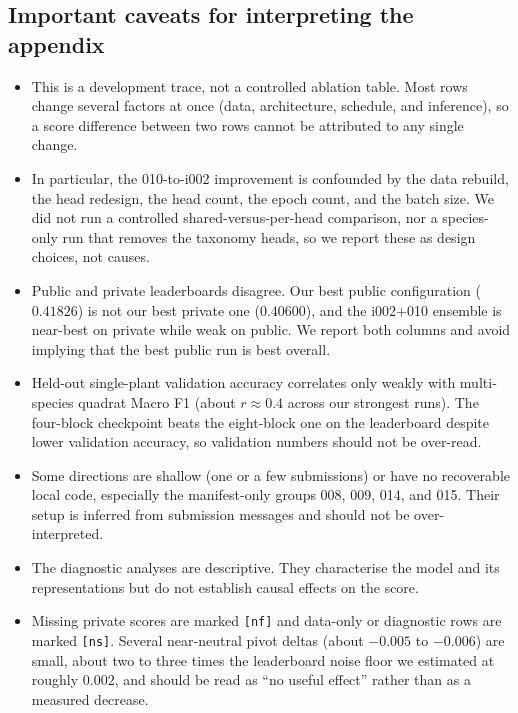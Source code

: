 \subsection{Important caveats for interpreting the appendix}
\label{sec:appendix_caveats}
\begin{itemize}
  \item This is a development trace, not a controlled ablation table. Most rows change
  several factors at once (data, architecture, schedule, and inference), so a score
  difference between two rows cannot be attributed to any single change.
  \item In particular, the 010-to-i002 improvement is confounded by the data rebuild,
  the head redesign, the head count, the epoch count, and the batch size. We did not
  run a controlled shared-versus-per-head comparison, nor a species-only run that
  removes the taxonomy heads, so we report these as design choices, not causes.
  \item Public and private leaderboards disagree. Our best public configuration
  ($0.41826$) is not our best private one ($0.40600$), and the i002+010 ensemble is
  near-best on private while weak on public. We report both columns and avoid implying
  that the best public run is best overall.
  \item Held-out single-plant validation accuracy correlates only weakly with
  multi-species quadrat Macro F1 (about $r{\approx}0.4$ across our strongest runs). The
  four-block checkpoint beats the eight-block one on the leaderboard despite lower
  validation accuracy, so validation numbers should not be over-read.
  \item Some directions are shallow (one or a few submissions) or have no recoverable
  local code, especially the manifest-only groups 008, 009, 014, and 015. Their setup
  is inferred from submission messages and should not be over-interpreted.
  \item The diagnostic analyses are descriptive. They characterise the model and its
  representations but do not establish causal effects on the score.
  \item Missing private scores are marked \texttt{[nf]} and data-only or diagnostic rows
  are marked \texttt{[ns]}. Several near-neutral pivot deltas (about $-0.005$ to
  $-0.006$) are small, about two to three times the leaderboard noise floor we estimated at
  roughly $0.002$, and should be read as ``no useful effect'' rather than as a measured decrease.
\end{itemize}
